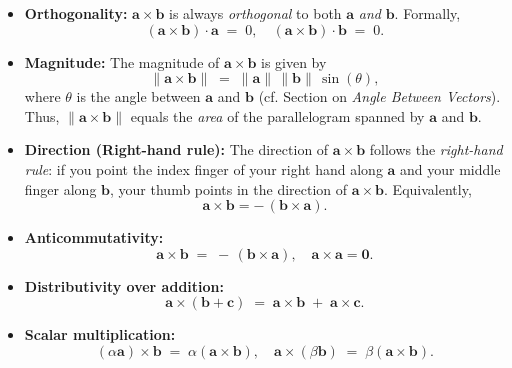 \begin{itemize}
\item \textbf{Orthogonality:} 
  $\mathbf{a} \times \mathbf{b}$ is always \emph{orthogonal} to both $\mathbf{a}$ \emph{and} $\mathbf{b}$. 
  Formally,
  \[
    (\mathbf{a} \times \mathbf{b}) \cdot \mathbf{a} \;=\; 0, 
    \quad
    (\mathbf{a} \times \mathbf{b}) \cdot \mathbf{b} \;=\; 0.
  \]

\item \textbf{Magnitude:} 
  The magnitude of $\mathbf{a} \times \mathbf{b}$ is given by
  \[
    \|\mathbf{a} \times \mathbf{b}\| 
    \;=\; \|\mathbf{a}\|\,\|\mathbf{b}\|\,\sin(\theta),
  \]
  where $\theta$ is the angle between $\mathbf{a}$ and $\mathbf{b}$ (cf. Section on \emph{Angle Between Vectors}). 
  Thus, $\|\mathbf{a} \times \mathbf{b}\|$ equals the \emph{area} of the parallelogram 
  spanned by $\mathbf{a}$ and $\mathbf{b}$.

\item \textbf{Direction (Right-hand rule):} 
  The direction of $\mathbf{a} \times \mathbf{b}$ follows the \emph{right-hand rule}: 
  if you point the index finger of your right hand along $\mathbf{a}$ 
  and your middle finger along $\mathbf{b}$, your thumb points in the direction 
  of $\mathbf{a} \times \mathbf{b}$. Equivalently, 
  \[
    \mathbf{a} \times \mathbf{b} = -\,(\mathbf{b} \times \mathbf{a}).
  \]

\item \textbf{Anticommutativity:}
  \[
    \mathbf{a} \times \mathbf{b} 
    \;=\; -\,(\mathbf{b} \times \mathbf{a}),
    \quad
    \mathbf{a} \times \mathbf{a} = \mathbf{0}.
  \]

\item \textbf{Distributivity over addition:}
  \[
    \mathbf{a} \times (\mathbf{b} + \mathbf{c}) 
    \;=\; \mathbf{a} \times \mathbf{b} \;+\; \mathbf{a} \times \mathbf{c}.
  \]

\item \textbf{Scalar multiplication:}
  \[
    (\alpha \mathbf{a}) \times \mathbf{b}
    \;=\; \alpha(\mathbf{a} \times \mathbf{b}),
    \quad
    \mathbf{a} \times (\beta \mathbf{b})
    \;=\; \beta(\mathbf{a} \times \mathbf{b}).
  \]
\end{itemize}

